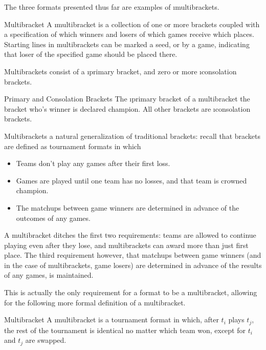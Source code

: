 {    The three formats presented thus far are examples of \i{multibrackets}.

    \begin{definition}{Multibracket}{}
        A \i{multibracket} is a collection of one or more brackets coupled with a specification of which winners and losers of which games receive which places. Starting lines in multibrackets can be marked a seed, or by a game, indicating that loser of the specified game should be placed there.
    \end{definition}

    Multibrackets consist of a \i{primary} bracket, and zero or more \i{consolation} brackets.

    \begin{definition}{Primary and Consolation Brackets}{}
        The \i{primary} bracket of a multibracket the bracket who's winner is declared champion. All other brackets are \i{consolation} brackets.
    \end{definition} %

    Multibrackets a natural generalization of traditional brackets: recall that brackets are defined as tournament formats in which
    \begin{itemize}
        \item Teams don't play any games after their first loss.
        \item Games are played until one team has no losses, and that team is crowned champion.
        \item The matchups between game winners are determined in advance of the outcomes of any games.
    \end{itemize} %

    A multibracket ditches the first two requirements: teams are allowed to continue playing even after they lose, and multibrackets can award more than just first place. The third requirement however, that matchups between game winners (and in the case of multibrackets, game losers) are determined in advance of the results of any games, is maintained.

    This is actually the only requirement for a format to be a multibracket, allowing for the following more formal definition of a multibracket.

    \begin{definition}{Multibracket}{}
        A \i{multibracket} is a tournament format in which, after $t_i$ plays $t_j$, the rest of the tournament is identical no matter which team won, except for $t_i$ and $t_j$ are swapped.
    \end{definition}

}
